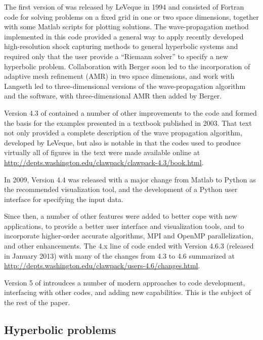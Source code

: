 The first version of \clawpack was released by LeVeque in 1994
\cite{clawpack-v1} and consisted of Fortran code for solving problems on a
fixed grid in one or two space dimensions, together with some Matlab scripts
for plotting solutions. The wave-propagation method implemented
in this code provided a general way to apply recently developed
high-resolution shock capturing methods to general hyperbolic systems and
required only that the user provide a ``Riemann solver'' to specify a new
hyperbolic problem.
Collaboration with Berger \cite{mjb-rjl:amrclaw}
soon led to the incorporation of adaptive mesh refinement (AMR) in two space
dimensions, and work with Langseth \cite{jol-rjl:3d, jol:thesis}
led to three-dimensional versions of the wave-propagation algorithm and the
software, with three-dimensional AMR then added by Berger.

Version 4.3 of \clawpack contained a number of other improvements to
the code and formed the basis for the examples presented in a textbook
\cite{rjl:fvmhp} published in 2003.  That text not only provided a
complete description of the wave propagation algorithm, developed by LeVeque,
but also is notable in that the codes used to produce virtually all of figures
in the text were made available online \cite{rjl:fvmhp}
at \url{http://depts.washington.edu/clawpack/clawpack-4.3/book.html}.

In 2009, \clawpack Version 4.4 was released with a major change from Matlab
to Python as the recommended visualization tool, and the development
of a Python user interface for specifying the input data.

Since then, a number of other features were added to better cope with new
applications, to provide a better user interface and visualization tools, and to
incorporate higher-order accurate algorithms, MPI and OpenMP parallelization, and
other enhancements. The \clawpack 4.x line of code ended with Version 4.6.3
(released in January 2013) with many of the changes from 4.3 to 4.6 summarized at
\url{http://depts.washington.edu/clawpack/users-4.6/changes.html}.

Version 5 of \clawpack introudces a number of modern
approaches to code development, interfacing with other codes,  and
adding new capabilities. This is 
the subject of the rest of the paper.

\subsection{Hyperbolic problems}\label{sec:hyp}


